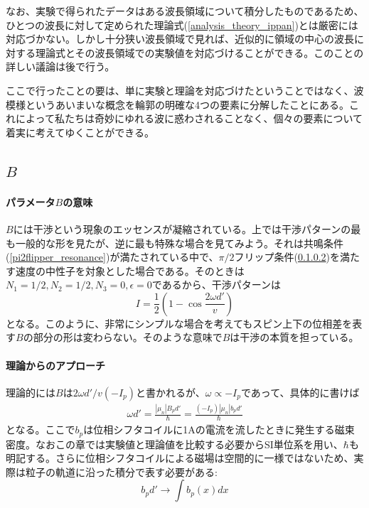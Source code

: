なお、実験で得られたデータはある波長領域について積分したものであるため、ひとつの波長に対して定められた理論式(\ref{analysis_theory_ippan})とは厳密には対応づかない。しかし十分狭い波長領域で見れば、近似的に領域の中心の波長に対する理論式とその波長領域での実験値を対応づけることができる。このことの詳しい議論は後で行う。

ここで行ったことの要は、単に実験と理論を対応づけたということではなく、波模様というあいまいな概念を輪郭の明確な4つの要素に分解したことにある。これによって私たちは奇妙にゆれる波に惑わされることなく、個々の要素について着実に考えてゆくことができる。

\subsection{$B$}
\paragraph{パラメータ$B$の意味}
$B$には干渉という現象のエッセンスが凝縮されている。上では干渉パターンの最も一般的な形を見たが、逆に最も特殊な場合を見てみよう。それは共鳴条件(\ref{pi2flipper_resonance})が満たされている中で、$\pi/2$フリップ条件(\ref{})を満たす速度の中性子を対象とした場合である。そのときは$N_1=1/2,N_2=1/2,N_3=0,\epsilon=0$であるから、干渉パターンは
\begin{equation}
I=\frac{1}{2}\left(1-\cos\frac{2\omega d'}{v}\right) \label{analysis_theory_simple}
\end{equation}
となる。このように、非常にシンプルな場合を考えてもスピン上下の位相差を表す$B$の部分の形は変わらない。そのような意味で$B$は干渉の本質を担っている。

\paragraph{理論からのアプローチ}
理論的には$B$は$2\omega d'/v(-I_p)$と書かれるが、$\omega \propto -I_p$であって、具体的に書けば
\begin{align}
\omega d'=\frac{|\mu_n|B_p d'}{\hbar}=\frac{(-I_p)|\mu_n| b_p d'}{\hbar}
\end{align}
となる。ここで$b_p$は位相シフタコイルに1Aの電流を流したときに発生する磁束密度。なおこの章では実験値と理論値を比較する必要からSI単位系を用い、$\hbar$も明記する。さらに位相シフタコイルによる磁場は空間的に一様ではないため、実際は粒子の軌道に沿った積分で表す必要がある:
\begin{equation}
b_p d' \rightarrow \int b_p(x) dx
\end{equation}

